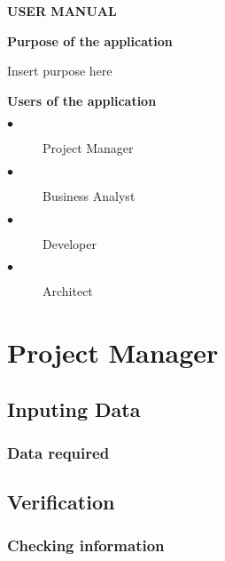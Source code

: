 \documentclass[a4paper,12pt]{article}
\date{07/09/2016}
\author{Preshane Pillay}
\begin{document}
  \begin{Huge}
    \centering
      \bf USER MANUAL \\
  \end{Huge}
  
  \vspace{4cm}

      \begin{Large}
	 \bfseries{ Purpose of the application} \\
      \end{Large}
      
	  Insert purpose here
  \vspace{4cm}
  
	   \begin{Large}
	 \bfseries{ Users of the application} \\
      \end{Large}
      
	  \begin{description}
	    \item[$\bullet$] Project Manager
	    \item[$\bullet$] Business Analyst
	    \item[$\bullet$] Developer
	    \item[$\bullet$] Architect
	  \end{description}
  
  \vspace{4cm}
      
      

\section{\bf Project Manager}

  \subsection{Inputing Data}

     \subsubsection{Data required}
  
   \subsection{Verification}

      \subsubsection{Checking information}
      
\end{document}
